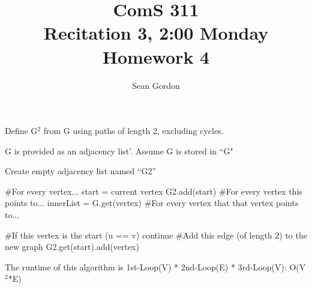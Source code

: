 \documentclass[12pt]{article}
\title{ComS 311\\Recitation 3, 2:00 Monday\\Homework 4}
\author{Sean Gordon}
\begin{document}
\maketitle


\begin{algorithm}[H]
\caption{Define G$^2$ from G using paths of length 2, excluding cycles.}
\begin{algorithmic}
\REQUIRE G is provided as an adjacency list'.
\STATE Assume G is stored in ``G"

\STATE
\STATE Create empty adjacency list named ``G2''
\STATE

\STATE \#For every vertex...
\STATE start = current vertex
\STATE G2.add(start)
\STATE
\STATE \#For every vertex this points to...
\STATE innerList = G.get(vertex)
\STATE
\STATE \#For every vertex that that vertex points to...

\STATE
\STATE \#If this vertex is the start (u == v)
\STATE continue
\ENDIF
\STATE
\STATE \#Add this edge (of length 2) to the new graph
\STATE G2.get(start).add(vertex)

\ENDFOR
\ENDFOR
\ENDFOR
\STATE

\STATE The runtime of this algorithm is
\STATE 1st-Loop(V) * 2nd-Loop(E) * 3rd-Loop(V): O(V$^2$*E)
\end{algorithmic}
\end{algorithm}




\pagebreak
\end{document}
